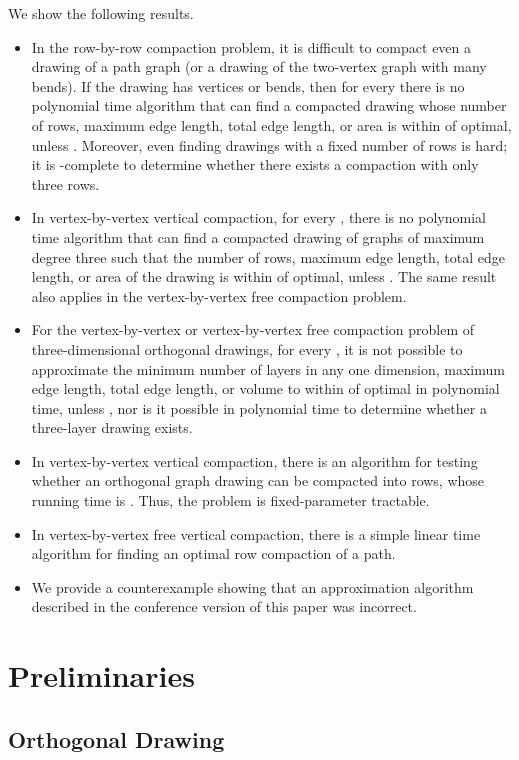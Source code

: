 \documentclass[12pt]{article}
\theoremstyle{definitions}
\begin{document}
We show the following results.
\begin{itemize}
\item 
In the row-by-row compaction problem, it is difficult to compact even a
drawing of a path graph (or a drawing of the two-vertex graph with many bends).
If the drawing has  vertices or bends, then for every   there is no
polynomial time algorithm that can find a compacted drawing whose number of
rows, maximum edge length, total edge length, or area is within
 of optimal, unless . Moreover, even
finding drawings with a fixed number of rows is hard; it is -complete
to determine whether there exists a compaction with only three rows.
\item 
In vertex-by-vertex vertical compaction, for every , there is no
polynomial time algorithm that can find a compacted drawing of graphs of maximum degree three such that the number of
rows, maximum edge length, total edge length, or area of the drawing is within
 of optimal, unless . The same result also applies in the
vertex-by-vertex free compaction problem.
\newpage \item 
For the vertex-by-vertex or vertex-by-vertex free compaction problem of  three-dimensional
orthogonal drawings, for every , it is not possible to approximate the
minimum number of layers in any one dimension, maximum edge length, total edge length, or volume to within  of
optimal in polynomial time, unless , nor is it possible in
polynomial time to determine whether a three-layer drawing exists.
\item 
In vertex-by-vertex vertical compaction, there is an algorithm for testing
whether an orthogonal graph drawing can be compacted into  rows, whose
running time is . Thus, the problem is fixed-parameter tractable.
\item 
In vertex-by-vertex free vertical compaction, there is a simple linear time algorithm for finding an optimal row compaction of a path.
\item
We provide a counterexample showing that an approximation algorithm described in the conference version of this paper was incorrect.
\end{itemize}

\section{Preliminaries}
\subsection{Orthogonal Drawing}
\end{document}
